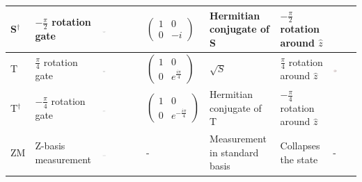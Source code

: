 \begin{table}[H]
\begin{tabular}{ C{0.3cm}  C{2cm}  C{1.5cm}  C{1.5cm} C{2.5cm} C{2cm} C{3.5cm}}
S$^\dagger$ & $-\frac{\pi}{2}$ rotation gate & \includegraphics[width=0.1\textwidth]{img/sdcircuit.png} &  $\begin{pmatrix}
 1 & 0 \\ 
 0 & -i
 \end{pmatrix}$ & Hermitian conjugate of S & $-\frac{\pi}{2}$ rotation around $\hat{z}$ & \\\midrule
T & $\frac{\pi}{4}$ rotation gate & \includegraphics[width=0.1\textwidth]{img/tcircuit.png} & $\begin{pmatrix}
 1 & 0 \\ 
 0 & e^{\frac{i\pi}{4}}
 \end{pmatrix}$ & $\sqrt{S}$ & $\frac{\pi}{4}$ rotation around $\hat{z}$ & \includegraphics[width=0.2\textwidth]{img/blochtgate.png}\\\midrule
T$^\dagger$ & $-\frac{\pi}{4}$ rotation gate & \includegraphics[width=0.1\textwidth]{img/tdcircuit.png} & $\begin{pmatrix}
 1 & 0 \\ 
 0 & e^{-\frac{i\pi}{4}}
 \end{pmatrix}$ & Hermitian conjugate of T & $-\frac{\pi}{4}$ rotation around $\hat{z}$ & \\\midrule
ZM & Z-basis measurement & \includegraphics[width=0.1\textwidth]{img/measurecircuit.png} & - & Measurement in standard basis & Collapses the state & - \\
\end{tabular}
\end{table}


